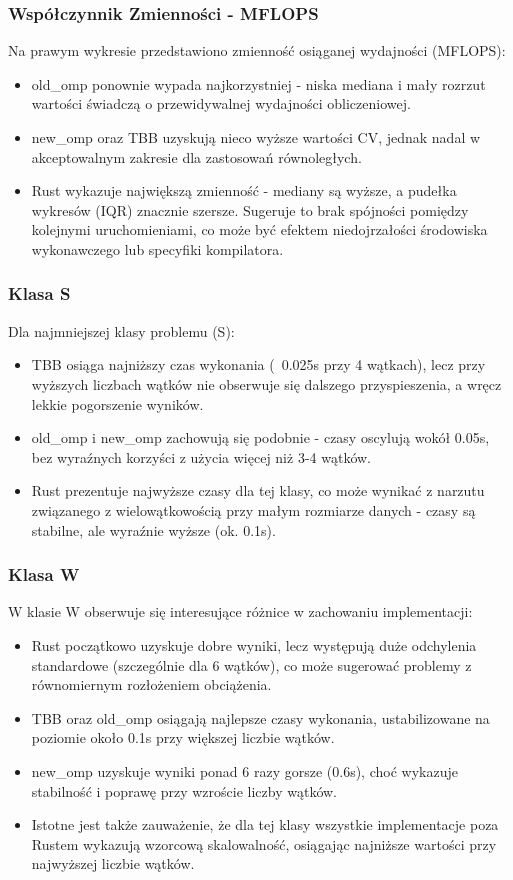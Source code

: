 \subsubsection{Współczynnik Zmienności - MFLOPS}
Na prawym wykresie przedstawiono zmienność osiąganej wydajności (MFLOPS):
\begin{itemize}
    \item old\_omp ponownie wypada najkorzystniej - niska mediana i mały rozrzut wartości świadczą o przewidywalnej wydajności obliczeniowej.
    \item new\_omp oraz TBB uzyskują nieco wyższe wartości CV, jednak nadal w akceptowalnym zakresie dla zastosowań równoległych.
    \item Rust wykazuje największą zmienność - mediany są wyższe, a pudełka wykresów (IQR) znacznie szersze. Sugeruje to brak spójności pomiędzy kolejnymi uruchomieniami, co może być efektem niedojrzałości środowiska wykonawczego lub specyfiki kompilatora.
\end{itemize}

\subsubsection{Klasa S}
Dla najmniejszej klasy problemu (S):
\begin{itemize}
    \item TBB osiąga najniższy czas wykonania (~0.025s przy 4 wątkach), lecz przy wyższych liczbach wątków nie obserwuje się dalszego przyspieszenia, a wręcz lekkie pogorszenie wyników.
    \item old\_omp i new\_omp zachowują się podobnie - czasy oscylują wokół 0.05s, bez wyraźnych korzyści z użycia więcej niż 3-4 wątków.
    \item Rust prezentuje najwyższe czasy dla tej klasy, co może wynikać z narzutu związanego z wielowątkowością przy małym rozmiarze danych - czasy są stabilne, ale wyraźnie wyższe (ok. 0.1s).
\end{itemize}

\subsubsection{Klasa W}
W klasie W obserwuje się interesujące różnice w zachowaniu implementacji:
\begin{itemize}
    \item Rust początkowo uzyskuje dobre wyniki, lecz występują duże odchylenia standardowe (szczególnie dla 6 wątków), co może sugerować problemy z równomiernym rozłożeniem obciążenia.
    \item TBB oraz old\_omp osiągają najlepsze czasy wykonania, ustabilizowane na poziomie około 0.1s przy większej liczbie wątków.
    \item new\_omp uzyskuje wyniki ponad 6 razy gorsze (0.6s), choć wykazuje stabilność i poprawę przy wzroście liczby wątków.
    \item Istotne jest także zauważenie, że dla tej klasy wszystkie implementacje poza Rustem wykazują wzorcową skalowalność, osiągając najniższe wartości przy najwyższej liczbie wątków.
\end{itemize}


